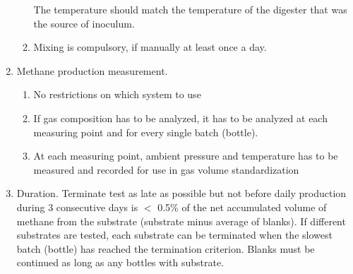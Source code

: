 \documentclass[]{article}
\begin{document}
\begin{enumerate}
\begin{enumerate}
        The temperature should match the temperature of the digester that was the source of inoculum.
      \item Mixing is compulsory, if manually at least once a day.
    \end{enumerate}
  \item Methane production measurement.
    \begin{enumerate}
      \item No restrictions on which system to use
      \item If gas composition has to be analyzed, it has to be analyzed at each measuring point and for every single batch (bottle).
      \item At each measuring point, ambient pressure and temperature has to be measured and recorded for use in gas volume standardization
    \end{enumerate}
  \item Duration. Terminate test as late as possible but not before daily  production during 3 consecutive days is $<$ 0.5\% of the net accumulated volume of methane from the substrate (substrate minus average of blanks). 
    If different substrates are tested, each substrate can be terminated when the slowest batch (bottle) has reached the termination criterion.
    Blanks must be continued as long as any bottles with substrate.
\end{enumerate}
\end{document}
